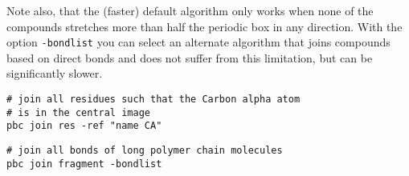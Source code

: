 \documentclass[a4paper, DIV12]{scrartcl}
\begin{document}
Note also, that the (faster) default algorithm only works when none of
the compounds stretches more than half the periodic box in any direction.
With the option \texttt{-bondlist} you can select an alternate algorithm
that joins compounds based on direct bonds and does not suffer from this
limitation, but can be significantly slower.


\begin{Verbatim}
# join all residues such that the Carbon alpha atom 
# is in the central image
pbc join res -ref "name CA"
\end{Verbatim}

\begin{Verbatim}
# join all bonds of long polymer chain molecules
pbc join fragment -bondlist
\end{Verbatim}

\end{document}
